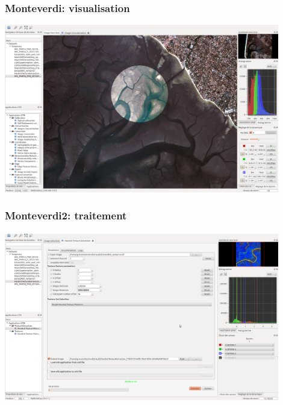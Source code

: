 \documentclass[8pt]{beamer}
\begin{document}
\begin{frame}
\frametitle{Monteverdi: visualisation}
\begin{minipage}[t][6cm][t]{\textwidth}
\begin{center}
\includegraphics[width=0.9\textwidth]{images/monteverdi2-loupe.png}
\end{center}
\end{minipage}
\end{frame}
\begin{frame}

\frametitle{Monteverdi2: traitement}
\begin{minipage}[t][6cm][t]{\textwidth}
\begin{center}
\includegraphics[width=0.9\textwidth]{images/monteverdi2-haralick.png}
\end{center}
\end{minipage}
\end{frame}
\end{document}
